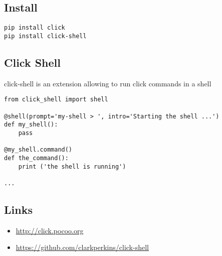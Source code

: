 \subsection{Install}

\begin{lstlisting}
pip install click
pip install click-shell
\end{lstlisting}

\subsection{Click Shell}

click-shell is an extension allowing to run click commands in a shell

\begin{lstlisting}
from click_shell import shell

@shell(prompt='my-shell > ', intro='Starting the shell ...')
def my_shell():
    pass

@my_shell.command()
def the_command():
    print ('the shell is running')

...
\end{lstlisting}

\subsection{Links}

\begin{itemize}
\item
  \url{http://click.pocoo.org}
\item
  \url{https://github.com/clarkperkins/click-shell}
\end{itemize}


